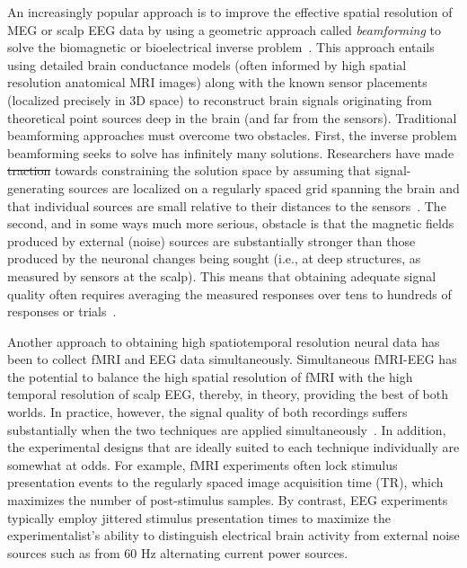 \documentclass[10pt]{article}
\providecommand{\DIFaddtex}[1]{{\protect\color{blue}\uwave{#1}}} %
\providecommand{\DIFdeltex}[1]{{\protect\color{red}\sout{#1}}}                      %
\providecommand{\DIFaddbegin}{} %
\providecommand{\DIFaddend}{} %
\providecommand{\DIFdelbegin}{} %
\providecommand{\DIFdelend}{} %
\providecommand{\DIFadd}[1]{\texorpdfstring{\DIFaddtex{#1}}{#1}} %
\providecommand{\DIFdel}[1]{\texorpdfstring{\DIFdeltex{#1}}{}} %
\newcommand{\DIFscaledelfig}{0.5}
\newlength{\DIFdelgraphicswidth} %
\newlength{\DIFdelgraphicsheight} %
\newcommand{\DIFaddincludegraphics}[2][]{{\color{blue}\fbox{\DIFOincludegraphics[#1]{#2}}}} %
\newcommand{\DIFdelincludegraphics}[2][]{%
\sbox{\DIFdelgraphicsbox}{\DIFOincludegraphics[#1]{#2}}%
\settoboxwidth{\DIFdelgraphicswidth}{\DIFdelgraphicsbox} %
\settoboxtotalheight{\DIFdelgraphicsheight}{\DIFdelgraphicsbox} %
\scalebox{\DIFscaledelfig}{%
\parbox[b]{\DIFdelgraphicswidth}{\usebox{\DIFdelgraphicsbox}\\[-\baselineskip] \rule{\DIFdelgraphicswidth}{0em}}\llap{\resizebox{\DIFdelgraphicswidth}{\DIFdelgraphicsheight}{%
\setlength{\unitlength}{\DIFdelgraphicswidth}%
\begin{picture}(1,1)%
\thicklines\linethickness{2pt} %
{\color[rgb]{1,0,0}\put(0,0){\framebox(1,1){}}}%
{\color[rgb]{1,0,0}\put(0,0){\line( 1,1){1}}}%
{\color[rgb]{1,0,0}\put(0,1){\line(1,-1){1}}}%
\end{picture}%
}\hspace*{3pt}}} %
} %
\DeclareRobustCommand{\DIFaddbegin}{\DIFOaddbegin \let\includegraphics\DIFaddincludegraphics} %
\DeclareRobustCommand{\DIFaddend}{\DIFOaddend \let\includegraphics\DIFOincludegraphics} %
\DeclareRobustCommand{\DIFdelbegin}{\DIFOdelbegin \let\includegraphics\DIFdelincludegraphics} %
\DeclareRobustCommand{\DIFdelend}{\DIFOaddend \let\includegraphics\DIFOincludegraphics} %
\begin{document}
An increasingly popular approach is to improve the effective spatial
resolution of MEG or scalp EEG data by using a geometric approach
called \textit{beamforming} to solve the biomagnetic or bioelectrical
inverse problem~\citep{Sarv87}.  This approach entails using detailed
brain conductance models (often informed by high spatial resolution
anatomical MRI images) along with the known sensor placements
(localized precisely in 3D space) to reconstruct brain signals
originating from theoretical point sources deep in the brain (and far
from the sensors).  Traditional beamforming approaches must overcome
two obstacles.  First, the inverse problem beamforming seeks to solve
has infinitely many solutions.  Researchers have made \DIFdelbegin \DIFdel{traction }\DIFdelend \DIFaddbegin \DIFadd{progress }\DIFaddend towards
constraining the solution space by assuming that signal-generating
sources are localized on a regularly spaced grid spanning the brain
and that individual sources are small relative to their distances to
the sensors~\citep{Snyd91, BailEtal01, HillEtal05}.  The second, and in
some ways much more serious, obstacle is that the magnetic fields
produced by external (noise) sources are substantially stronger than
those produced by the neuronal changes being sought (i.e., at deep
structures, as measured by sensors at the scalp).  This means that
obtaining adequate signal quality often requires averaging the
measured responses over tens to hundreds of responses or trials~\citep[e.g., see review by][]{HillEtal05}.

Another approach to obtaining high spatiotemporal resolution neural data has
been to collect fMRI and EEG data simultaneously. Simultaneous fMRI-EEG has the
potential to balance the high spatial resolution of fMRI with the high temporal
resolution of scalp EEG, thereby, in theory, providing the best of both worlds.
In practice, however, the signal quality of both recordings suffers
substantially when the two techniques are applied simultaneously~\citep[e.g.,
see review by][]{HustEtal12}. In addition, the experimental designs that are
ideally suited to each technique individually are somewhat at odds. For example,
fMRI experiments often lock stimulus presentation events to the regularly spaced
image acquisition time (TR), which maximizes the number of post-stimulus
samples.  By contrast, EEG experiments typically employ jittered stimulus
presentation times to maximize the experimentalist's ability to distinguish
electrical brain activity from external noise sources such as from 60 Hz
alternating current power sources.
\end{document}
